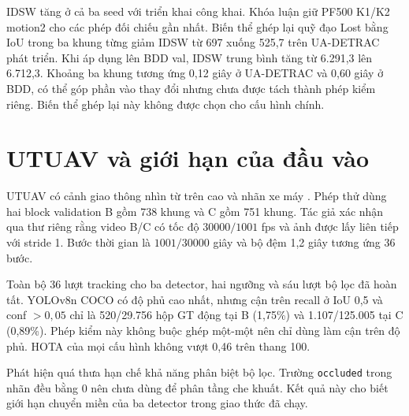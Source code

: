 IDSW tăng ở cả ba seed với triển khai công khai. Khóa luận giữ PF500 K1/K2 motion2 cho các phép đối chiếu gần nhất. Biến thể ghép lại quỹ đạo Lost bằng IoU trong ba khung từng giảm IDSW từ 697 xuống 525,7 trên UA-DETRAC phát triển. Khi áp dụng lên BDD val, IDSW trung bình tăng từ 6.291,3 lên 6.712,3. Khoảng ba khung tương ứng 0,12 giây ở UA-DETRAC và 0,60 giây ở BDD, có thể góp phần vào thay đổi nhưng chưa được tách thành phép kiểm riêng. Biến thể ghép lại này không được chọn cho cấu hình chính.

\section{UTUAV và giới hạn của đầu vào}
UTUAV có cảnh giao thông nhìn từ trên cao và nhãn xe máy \cite{utuav}. Phép thử dùng hai block validation B gồm 738 khung và C gồm 751 khung. Tác giả xác nhận qua thư riêng rằng video B/C có tốc độ $30000/1001$ fps và ảnh được lấy liên tiếp với stride 1. Bước thời gian là $1001/30000$ giây và bộ đệm 1,2 giây tương ứng 36 bước.

Toàn bộ 36 lượt tracking cho ba detector, hai ngưỡng và sáu lượt bộ lọc đã hoàn tất. YOLOv8n COCO có độ phủ cao nhất, nhưng cận trên recall ở IoU 0,5 và conf $>0{,}05$ chỉ là 520/29.756 hộp GT động tại B (1,75\%) và 1.107/125.005 tại C (0,89\%). Phép kiểm này không buộc ghép một-một nên chỉ dùng làm cận trên độ phủ. HOTA của mọi cấu hình không vượt 0,46 trên thang 100.

Phát hiện quá thưa hạn chế khả năng phân biệt bộ lọc. Trường \texttt{occluded} trong nhãn đều bằng 0 nên chưa dùng để phân tầng che khuất. Kết quả này cho biết giới hạn chuyển miền của ba detector trong giao thức đã chạy.



